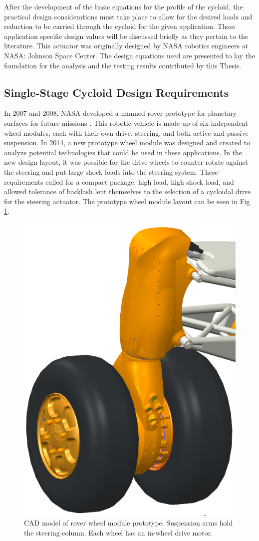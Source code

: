 After the development of the basic equations for the profile of the cycloid, the practical design considerations must take place to allow for the desired loads and reduction to be carried through the cycloid for the given application. These application specific design values will be discussed briefly as they pertain to the literature. This actuator was originally designed by NASA robotics engineers at NASA: Johnson Space Center. The design equations used are presented to lay the foundation for the analysis and the testing results contributed by this Thesis.

\subsection{Single-Stage Cycloid Design Requirements}

In 2007 and 2008, NASA developed a manned rover prototype for planetary surfaces for future missions \cite{ref:rover}.
This robotic vehicle is made up of six independent wheel modules, each with their own drive, steering, and both active and passive suspension.
In 2014, a new prototype wheel module was designed and created to analyze potential technologies that could be used in these applications.
In the new design layout, it was possible for the drive wheels to counter-rotate against the steering and put large shock loads into the steering system.
These requirements called for a compact package, high load, high shock load, and allowed tolerance of backlash lent themselves to the selection of a cycloidal drive for the steering actuator.
The prototype wheel module layout can be seen in Fig \ref{fig:wheel_module}.

\begin{figure}[!b]
   \centering
   \includegraphics[width=0.40\linewidth]{fig/wheel_module_CAD}
   \caption{CAD model of rover wheel module prototype.
   Suspension arms hold the steering column.
   Each wheel has an in-wheel drive motor.}
   \label{fig:wheel_module}
\end{figure}

